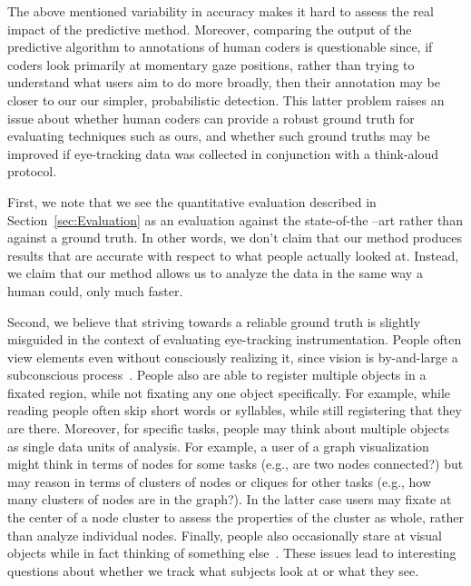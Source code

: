The above mentioned variability in accuracy makes it hard to assess the real impact of the predictive method. Moreover, comparing the output of the predictive algorithm to annotations of human coders is questionable since, if coders look primarily at momentary gaze positions, rather than trying to understand what users aim to do more broadly, then their annotation may be closer to our our simpler, probabilistic detection.  This latter problem raises an issue about whether human coders can provide a robust ground truth for evaluating techniques such as ours, and whether such ground truths may be improved if eye-tracking data was collected in conjunction with a think-aloud protocol.  

First, we note that we see the quantitative evaluation described in Section~\ref{sec:Evaluation} as an evaluation against the state-of-the –art rather than against a ground truth. In other words, we don't claim that our method produces results that are accurate with respect to what people actually looked at. Instead, we claim that our method allows us to analyze the data in the same way a human could, only much faster. 

Second, we believe that striving towards a reliable ground truth is slightly misguided in the context of evaluating eye-tracking instrumentation.  People often view elements even without consciously realizing it, since vision is by-and-large a subconscious process~\cite{duchowski2007eye}. People also are able to register multiple objects in a fixated region, while not fixating any one object specifically. For example, while reading people often skip short words or syllables, while still registering that they are there. Moreover, for specific tasks, people may think about multiple objects as single data units of analysis. For example, a user of a graph visualization might think in terms of nodes for some tasks (e.g., are two nodes connected?) but may reason in terms of clusters of nodes or cliques for other tasks (e.g., how many clusters of nodes are in the graph?). In the latter case users may fixate at the center of a node cluster to assess the properties of the cluster as whole, rather than analyze individual nodes. Finally, people also occasionally stare at visual objects while in fact thinking of something else~\cite{duchowski2007eye}. These issues lead to interesting questions about whether we track what subjects look at or what they see.  


